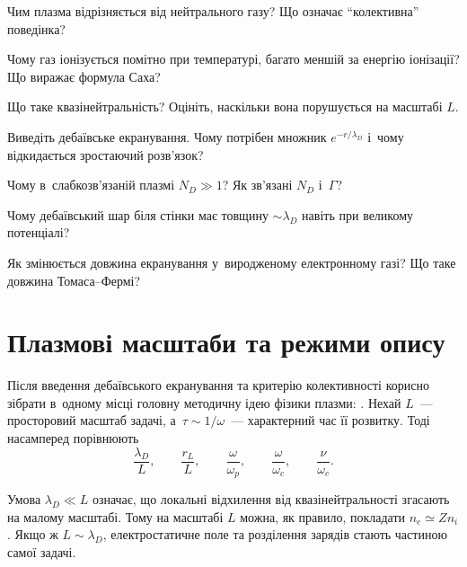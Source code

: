 \begin{Questions}
\begin{quizlist}
\item Чим плазма відрізняється від нейтрального газу? Що означає
		  \enquote{колективна} поведінка?

\item Чому газ іонізується помітно при температурі, багато меншій за енергію
		  іонізації? Що виражає формула Саха?

\item Що таке квазінейтральність? Оцініть, наскільки вона порушується на масштабі
		  $L$.

\item Виведіть дебаївське екранування. Чому потрібен множник $e^{-r/\lambda_D}$
		  і~чому відкидається зростаючий розв'язок?

\item Чому в~слабкозв'язаній плазмі $N_D\gg1$? Як зв'язані $N_D$ і~$\Gamma$?

\item Чому дебаївський шар біля стінки має товщину $\sim\lambda_D$ навіть при
		  великому потенціалі?

\item Як змінюється довжина екранування у~виродженому електронному газі? Що таке
		  довжина Томаса--Фермі?

\end{quizlist}
\end{Questions}

\chapter{Плазмові масштаби та режими опису}\label{sec:plasma-scales}\hypertarget{plasma-scales}{}

Після введення дебаївського екранування та критерію колективності корисно зібрати в~одному
місці головну методичну ідею фізики плазми: . Нехай $L$~--- просторовий масштаб
задачі, а~$\tau\sim1/\omega$~--- характерний час її розвитку. Тоді насамперед порівнюють
\begin{equation*}
 \frac{\lambda_D}{L},\qquad \frac{r_L}{L},\qquad
 \frac{\omega}{\omega_p},\qquad \frac{\omega}{\omega_c},\qquad
 \frac{\nu}{\omega_c}.
\end{equation*}

Умова $\lambda_D\ll L$ означає, що локальні відхилення від квазінейтральності згасають на
малому масштабі. Тому на масштабі $L$ можна, як правило, покладати $n_e\simeq Zn_i$. Якщо
ж $L\sim\lambda_D$, електростатичне поле та розділення зарядів стають частиною самої
задачі.

